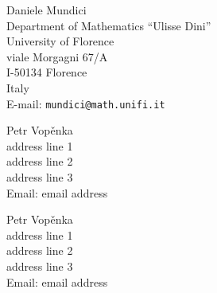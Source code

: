 \documentclass{book}
\begin{document}
\tableofcontents




{}

\medskip
\noindent Daniele Mundici
\\ Department of Mathematics ``Ulisse Dini'' \\
University of Florence \\
viale Morgagni 67/A \\
I-50134 Florence \\
Italy\\
E-mail: \texttt{mundici@math.unifi.it}

\EndPaper



{}


\medskip
\noindent Petr Vop\v enka\\
address line 1\\
address line 2\\
address line 3\\
Email: email address

\EndPaper





{}

\medskip
\noindent Petr Vop\v enka\\
address line 1\\
address line 2\\
address line 3\\
Email: email address
\end{document}
